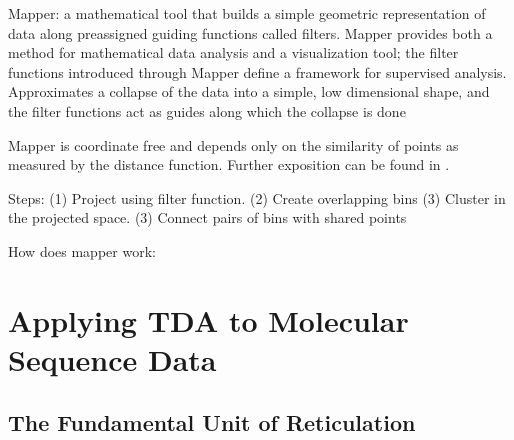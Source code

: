 Mapper: a mathematical tool that builds a simple geometric representation of data along preassigned guiding functions called filters. Mapper provides both a method for mathematical data analysis and a visualization tool; the filter functions introduced through Mapper define a framework for supervised analysis. Approximates a collapse of the data into a simple, low dimensional shape, and the filter functions act as guides along which the collapse is done


Mapper is coordinate free and depends only on the similarity of points as measured by the distance function.
Further exposition can be found in \cite{Lum:2013cz}.



Steps:
(1) Project using filter function.
(2) Create overlapping bins
(3) Cluster in the projected space.
(3) Connect pairs of bins with shared points



How does mapper work:

\section{Applying TDA to Molecular Sequence Data}


\subsection{The Fundamental Unit of Reticulation}




